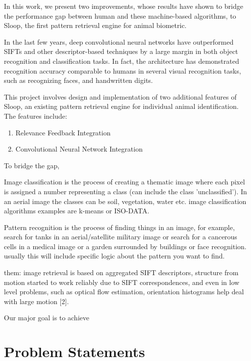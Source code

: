 In this work, we present two improvements, whose results have shown to bridge the performance gap between human and these machine-based algorithms, to Sloop, the first pattern retrieval engine for animal biometric.

In the last few years, deep convolutional neural networks\cite{lecun95, kriz12} have outperformed SIFTs and other descriptor-based techniques by a large margin in both object recognition and classification tasks\cite{kriz12, fisher14, ILSVRC15}. In fact, the architecture has demonstrated recognition accuracy comparable to humans in several visual recognition tasks, such as recognizing faces\cite{deepface14}, and handwritten digits\cite{mnist13}. 



This project involves design and implementation of two additional features of Sloop, an existing pattern retrieval engine for individual animal identification. The features include:
\begin{enumerate}
	\item Relevance Feedback Integration
	\item Convolutional Neural Network Integration
\end{enumerate}


To bridge the gap, 



Image classification is the process of creating a thematic image where each pixel is assigned a number representing a class (can include the class 'unclassified'). In an aerial image the classes can be soil, vegetation, water etc. image classification algorithms examples are k-means or ISO-DATA.

Pattern recognition is the process of finding things in an image, for example, search for tanks in an aerial/satellite military image or search for a cancerous cells in a medical image or a garden surrounded by buildings or face recognition. usually this will include specific logic about the pattern you want to find.

them: image retrieval is based on aggregated SIFT descriptors, structure from motion started to work reliably due to SIFT correspondences, and even in low level problems, such as optical flow estimation, orientation histograms help deal with large motion [2].

Our major goal is to achieve 

\section{Problem Statements}

